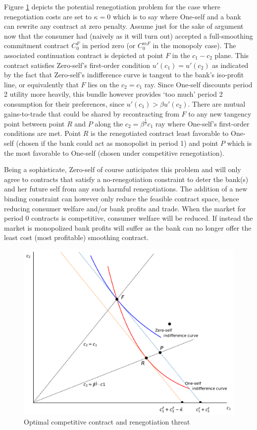 \documentclass[11pt,english]{article}
\theoremstyle{plain}
\theoremstyle{definition}
\begin{document}
Figure \ref{fig:c1c2} depicts the potential renegotiation problem for the case where renegotiation costs are
set to $\kappa=0$ which is to say where One-self and a bank can rewrite
any contract at zero penalty. Assume \textendash{} just for the sake
of argument now \textendash{} that the consumer had (naively as it
will turn out) accepted a full-smoothing commitment contract $C_{0}^{F}$
in period zero (or $C_{0}^{mF}$ in the monopoly case). The associated
continuation contract is depicted at point $F$ in the $c_{1}-c_{2}$
plane. This contract satisfies Zero-self's first-order condition $u'(c_{1})=u'(c_{2})$
as indicated by the fact that Zero-self's indifference curve is tangent
to the bank's iso-profit line, or equivalently that \(F\) lies on the \(c_2=c_1\) ray. Since One-self discounts period 2 utility
more heavily, this bundle however provides `too much' period 2 consumption for their preferences, since $u'(c_{1})>\beta u'(c_{2}).$ There are mutual gains-to-trade that could be shared by recontracting
from $F$ to any new tangency point between point \(R\) and \(P\) along the $c_{2}=\beta^{\frac{1}{\rho}}c_{1}$
ray where One-self's first-order conditions are met. Point
$R$ is the renegotiated contract least favorable to One-self
(chosen if the bank could act as monopolist in period 1) and point
$P$ which is the most favorable to One-self
(chosen under competitive renegotiation).

Being a sophisticate, Zero-self of course anticipates this problem and will only agree to contracts that satisfy a no-renegotiation constraint
to deter the bank(s) and her future self from any such harmful renegotiations. The addition of a new binding constraint can however only reduce the feasible contract space, hence reducing
consumer welfare and/or bank profits and trade. When the market for
period 0 contracts is competitive, consumer welfare will be reduced.
If instead the market is monopolized bank profits will suffer as the
bank can no longer offer the least cost (most profitable) smoothing
contract.

\begin{figure}[p]
  \includegraphics[scale=0.6]{Figure1.pdf}
  \caption{Optimal competitive contract and renegotiation threat}
  \label{fig:c1c2}
\end{figure}
\end{document}
